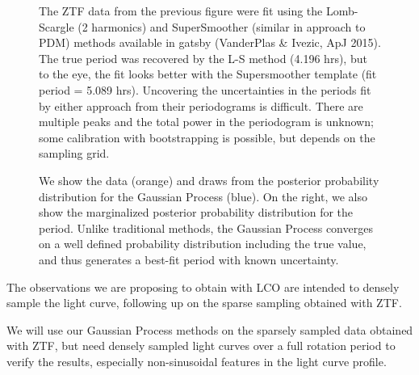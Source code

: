 \documentclass[11pt]{article}
\begin{document}
\begin{figure}[hbt]
\caption{The ZTF data from the previous figure were fit using the Lomb-Scargle (2 harmonics) and SuperSmoother (similar in approach to PDM) methods available in gatsby (VanderPlas \& Ivezic, ApJ 2015). The true period was recovered by the L-S method (4.196 hrs), but to the eye, the fit looks better with the Supersmoother template (fit period = 5.089 hrs). Uncovering the uncertainties in the periods fit by either approach from their periodograms is difficult. There are multiple peaks and the total power in the periodogram is unknown; some calibration with bootstrapping is possible, but depends on the sampling grid.}
\end{figure}

\begin{figure}[hbt]
\caption{We show the data (orange) and draws from the posterior probability distribution for the Gaussian Process (blue). On the right, we also show the marginalized posterior probability distribution for the period. Unlike traditional methods, the Gaussian Process converges on a well defined probability distribution including the true value, and thus generates a best-fit period with known uncertainty.
}
\end{figure}

\clearpage


%

%

\expdesign
The observations we are proposing to obtain with LCO are intended to
densely sample the light curve, following up on the sparse sampling
obtained with ZTF.

We will use our Gaussian Process methods on the sparsely sampled data
obtained with ZTF, but need densely sampled light curves over a full
rotation period to verify the results, especially non-sinusoidal
features in the light curve profile. 
\end{document}
